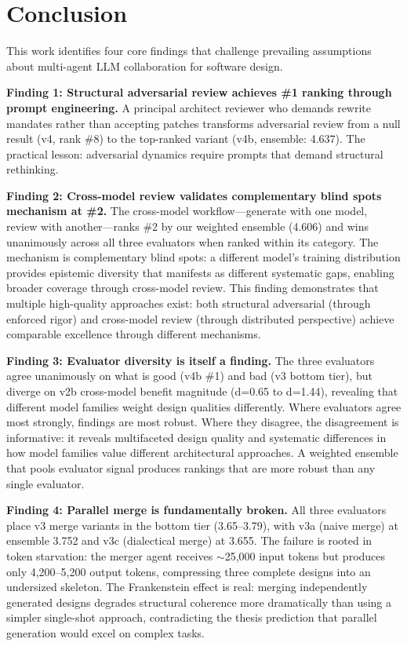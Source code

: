 \documentclass[conference]{IEEEtran}
\begin{document}
\section{Conclusion}

This work identifies four core findings that challenge prevailing assumptions about multi-agent LLM collaboration for software design.

\textbf{Finding 1: Structural adversarial review achieves \#1 ranking through prompt engineering.} A principal architect reviewer who demands rewrite mandates rather than accepting patches transforms adversarial review from a null result (v4, rank \#8) to the top-ranked variant (v4b, ensemble: 4.637). The practical lesson: adversarial dynamics require prompts that demand structural rethinking.

\textbf{Finding 2: Cross-model review validates complementary blind spots mechanism at \#2.} The cross-model workflow---generate with one model, review with another---ranks \#2 by our weighted ensemble (4.606) and wins unanimously across all three evaluators when ranked within its category. The mechanism is complementary blind spots: a different model's training distribution provides epistemic diversity that manifests as different systematic gaps, enabling broader coverage through cross-model review. This finding demonstrates that multiple high-quality approaches exist: both structural adversarial (through enforced rigor) and cross-model review (through distributed perspective) achieve comparable excellence through different mechanisms.

\textbf{Finding 3: Evaluator diversity is itself a finding.} The three evaluators agree unanimously on what is good (v4b \#1) and bad (v3 bottom tier), but diverge on v2b cross-model benefit magnitude (d=0.65 to d=1.44), revealing that different model families weight design qualities differently. Where evaluators agree most strongly, findings are most robust. Where they disagree, the disagreement is informative: it reveals multifaceted design quality and systematic differences in how model families value different architectural approaches. A weighted ensemble that pools evaluator signal produces rankings that are more robust than any single evaluator.

\textbf{Finding 4: Parallel merge is fundamentally broken.} All three evaluators place v3 merge variants in the bottom tier (3.65--3.79), with v3a (naive merge) at ensemble 3.752 and v3c (dialectical merge) at 3.655. The failure is rooted in token starvation: the merger agent receives $\sim$25,000 input tokens but produces only 4,200--5,200 output tokens, compressing three complete designs into an undersized skeleton. The Frankenstein effect is real: merging independently generated designs degrades structural coherence more dramatically than using a simpler single-shot approach, contradicting the thesis prediction that parallel generation would excel on complex tasks.
\end{document}
